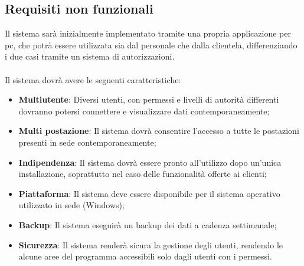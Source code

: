 \subsection{Requisiti non funzionali}
Il sistema sarà inizialmente implementato tramite una propria applicazione per pc, che potrà essere utilizzata sia dal personale
che dalla clientela, differenziando i due casi tramite un sistema di autorizzazioni.\\\\
Il sistema dovrà avere le seguenti caratteristiche:
\begin{itemize}
  \item{\textbf{Multiutente}}: Diversi utenti, con permessi e livelli di autorità differenti dovranno potersi connettere e visualizzare dati
    contemporaneamente;
  \item{\textbf{Multi postazione}}: Il sistema dovrà consentire l'accesso a tutte le postazioni presenti in sede contemporaneamente;
  \item{\textbf{Indipendenza}}: Il sistema dovrà essere pronto all'utilizzo dopo un'unica installazione, soprattutto nel caso delle funzionalità offerte ai clienti;
  \item{\textbf{Piattaforma}}: Il sistema deve essere disponibile per il sistema operativo utilizzato in sede (Windows);
  \item{\textbf{Backup}}: Il sistema eseguirà un backup dei dati a cadenza settimanale;
  \item{\textbf{Sicurezza}}: Il sistema renderà sicura la gestione degli utenti, rendendo le alcune aree del programma accessibili solo dagli utenti con i permessi.
\end{itemize} 
